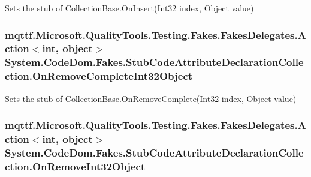 Sets the stub of Collection\-Base.\-On\-Insert(\-Int32 index, Object value)

\hypertarget{class_system_1_1_code_dom_1_1_fakes_1_1_stub_code_attribute_declaration_collection_a34eee20656a65c046d388092a9e2bab4}{
\subsubsection[{On\-Remove\-Complete\-Int32\-Object}]{\setlength{\rightskip}{0pt plus 5cm}mqttf.\-Microsoft.\-Quality\-Tools.\-Testing.\-Fakes.\-Fakes\-Delegates.\-Action$<$int, object$>$ System.\-Code\-Dom.\-Fakes.\-Stub\-Code\-Attribute\-Declaration\-Collection.\-On\-Remove\-Complete\-Int32\-Object}}\label{class_system_1_1_code_dom_1_1_fakes_1_1_stub_code_attribute_declaration_collection_a34eee20656a65c046d388092a9e2bab4}


Sets the stub of Collection\-Base.\-On\-Remove\-Complete(\-Int32 index, Object value)

\hypertarget{class_system_1_1_code_dom_1_1_fakes_1_1_stub_code_attribute_declaration_collection_adc22530c851fe3fc7f813e8175e8ab97}{
\subsubsection[{On\-Remove\-Int32\-Object}]{\setlength{\rightskip}{0pt plus 5cm}mqttf.\-Microsoft.\-Quality\-Tools.\-Testing.\-Fakes.\-Fakes\-Delegates.\-Action$<$int, object$>$ System.\-Code\-Dom.\-Fakes.\-Stub\-Code\-Attribute\-Declaration\-Collection.\-On\-Remove\-Int32\-Object}}\label{class_system_1_1_code_dom_1_1_fakes_1_1_stub_code_attribute_declaration_collection_adc22530c851fe3fc7f813e8175e8ab97}


